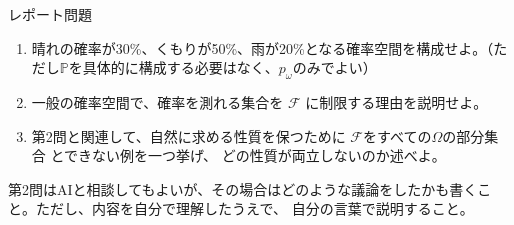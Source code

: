 \documentclass[a4paper,10pt,pdflatex,ja=standard,jafont=ipaex-type1,
  magstyle=real,scale=1]{bxjsarticle}
\newcommand{\topic}[1]{\par\vspace{5pt}
  {\large\sffamily\mdseries\color{accent}#1}\par\vspace{2pt}}
\newcommand{\keybox}[1]{\par\vspace{3pt}\begingroup
  \setlength{\fboxsep}{5pt}
  \colorbox{soft}{\parbox{\dimexpr\linewidth-2\fboxsep\relax}{#1}}%
  \endgroup\par\vspace{2pt}}
\newcommand{\F}{\mathcal F}
\begin{document}
\topic{レポート問題}
\begin{enumerate}[label=\arabic*.]
  \item 晴れの確率が30\%、くもりが50\%、雨が20\%となる確率空間を構成せよ。（ただし$\mathbb P$を具体的に構成する必要はなく、$p_{\omega}$のみでよい）
  \item 一般の確率空間で、確率を測れる集合を $\F$ に制限する理由を説明せよ。
  \item 第2問と関連して、自然に求める性質を保つために $\F$をすべての$\Omega$の部分集合 とできない例を一つ挙げ、
  どの性質が両立しないのか述べよ。
\end{enumerate}
\keybox{第2問はAIと相談してもよいが、その場合はどのような議論をしたかも書くこと。ただし、内容を自分で理解したうえで、
自分の言葉で説明すること。}
\end{document}

